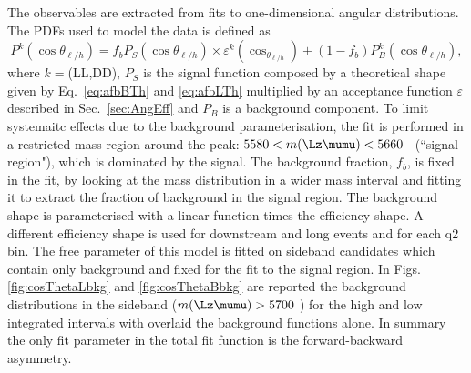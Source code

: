 The observables are extracted from fits to one-dimensional angular distributions.
%
%
The PDFs used to model the data is defined as
%
\begin{equation}
P^k(\cos\theta_{\ell/h}) = f_b P_S(\cos\theta_{\ell/h}) \times \varepsilon^k(\cos_{\theta_{\ell/h}}) + 
		(1-f_b)P_B^k(\cos\theta_{\ell/h}),
\end{equation}
%
where $k=$(LL,DD), $P_S$ is the signal function composed by a theoretical shape given by Eq.~\ref{eq:afbBTh} and
\ref{eq:afbLTh} multiplied by an acceptance function $\varepsilon$ described in Sec.~\ref{sec:AngEff}
and $P_B$ is a background component. To limit systemaitc effects due to the background parameterisation, 
the fit is performed in a restricted mass region around the peak:
$5580 < m(\Lz\mumu) < 5660 $ \mevcc ~(``signal region"), which is dominated by the signal.
The background fraction, $f_b$, is fixed in the fit, by looking at the mass distribution 
in a wider mass interval and fitting it to extract the fraction of background in the signal region.
The background shape is parameterised with a linear function times the efficiency shape.
A different efficiency shape is used for downstream and long events and for each q2 bin.
The free parameter of this model is fitted on sideband candidates which contain only background
and fixed for the fit to the signal region. In Figs. \ref{fig:cosThetaLbkg} and \ref{fig:cosThetaBbkg} 
are reported the background distributions in the sideband ($m(\Lz\mumu) > 5700$ \mevcc)
for the high and low \qsq integrated intervals with overlaid the background functions alone.
In summary the only fit parameter in the total fit function is the forward-backward asymmetry.

